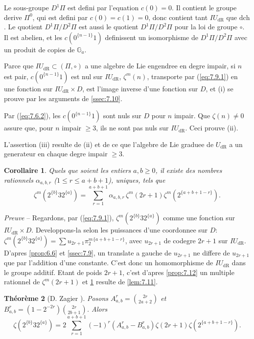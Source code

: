 \documentclass[11pt,a4paper]{article}
\theoremstyle{plain}
\newtheorem{theorem}{Th\'eor\`eme}
\newtheorem{corollary}[theorem]{Corollaire}
\theoremstyle{definition}
\newcommand{\Ga}{\mathbb{G}_a}
\newcommand{\dR}{\mathrm{dR}}
\begin{document}
Le sous-groupe $D^1 \Pi$ est defini par l'equation $c(0) = 0$. Il contient le groupe derive $\Pi^0$, qui est defini par $c(0) = c(1) = 0$, donc contient tant $IU_{\dR}$ que $\mathrm{dch}$. Le quotient $D^1\Pi/D^2\Pi$ est aussi le quotient $D^1\Pi/D^2\Pi$ pour la loi de groupe $\circ$. Il est abelien, et les $c(0^{\{n-1\}}1)$ definissent un isomorphisme de $D^1\Pi/D^2\Pi$ avec un produit de copies de $\Ga$.

Parce que $IU_{\dR} \subset (\Pi, \circ)$ a une algebre de Lie engendree en degre impair, si $n$ est pair, $c(0^{\{n-1\}}1)$ est nul sur $IU_{\dR}$, $\zeta^m(n)$, transporte par (\ref{eq:7.9.1}) en une fonction sur $IU_{\dR} \times D$, est l'image inverse d'une fonction sur $D$, et (i) se prouve par les arguments de \ref{ssec:7.10}.

Par (\ref{eq:7.6.2}), les $c(0^{\{n-1\}}1)$ sont nuls sur $D$ pour $n$ impair. Que $\zeta(n) \neq 0$ assure que, pour $n$ impair $\geq 3$, ils ne sont pas nuls sur $IU_{\dR}$. Ceci prouve (ii).

L'assertion (iii) resulte de (ii) et de ce que l'algebre de Lie graduee de $U_{\dR}$ a un generateur en chaque degre impair $\geq 3$.

\begin{corollary}\label{cor:7.13}
Quels que soient les entiers $a, b \geq 0$, il existe des nombres rationnels $\alpha_{a,b,r}$ ($1 \leq r \leq a+b+1$), uniques, tels que
\begin{equation}\label{eq:7.13.1}
\zeta^m(2^{\{b\}} 3 2^{\{a\}}) = \sum_{r=1}^{a+b+1} \alpha_{a,b,r} \, \zeta^m(2r+1) \zeta^m(2^{\{a+b+1-r\}}).
\end{equation}
\end{corollary}

\noindent \textit{Preuve} -- Regardons, par (\ref{eq:7.9.1}), $\zeta^m(2^{\{b\}} 3 2^{\{a\}})$ comme une fonction sur $IU_{\dR} \times D$. Developpons-la selon les puissances d'une coordonnee sur $D$: $\zeta^m(2^{\{b\}} 3 2^{\{a\}}) = \sum u_{2r+1} \pi_2^m{}^{\{a+b+1-r\}}$, avec $u_{2r+1}$ de codegre $2r+1$ sur $IU_{\dR}$. D'apres \ref{prop:6.6} et \ref{ssec:7.9}, un translate a gauche de $u_{2r+1}$ ne differe de $u_{2r+1}$ que par l'addition d'une constante. C'est donc un homomorphisme de $IU_{\dR}$ dans le groupe additif. Etant de poids $2r+1$, c'est d'apres \ref{prop:7.12} un multiple rationnel de $\zeta^m(2r+1)$ et \ref{cor:7.13} resulte de \ref{lem:7.11}.

\begin{theorem}[D. Zagier {\cite{Zagier}}]\label{thm:7.14}
Posons $A_{a,b}^r = \binom{2r}{2a+2}$ et $B_{a,b}^r = (1-2^{-2r}) \binom{2r}{2b+1}$. Alors
\begin{equation}\label{eq:7.14.1}
\zeta(2^{\{b\}} 3 2^{\{a\}}) = 2 \sum_{r=1}^{a+b+1} (-1)^r (A_{a,b}^r - B_{a,b}^r) \zeta(2r+1) \zeta(2^{\{a+b+1-r\}}).
\end{equation}
\end{theorem}
\end{document}
